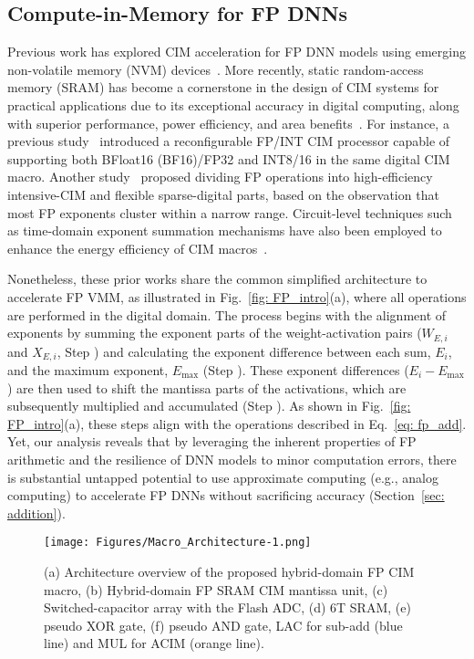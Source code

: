 \subsection{Compute-in-Memory for FP DNNs}







Previous work has explored CIM acceleration for FP DNN models using emerging non-volatile memory (NVM) devices~\cite{luo2020accelerating, PF_CIM_RRAM_0}.
More recently, static random-access memory (SRAM) has become a cornerstone in the design of CIM systems for practical applications due to its exceptional accuracy in digital computing, along with superior performance, power efficiency, and area benefits~\cite{reCIM, Sparse_intense, SRAM_CIM_INT_1, SRAM_CIM_FP_1}.
For instance, a previous study~\cite{reCIM} introduced a reconfigurable FP/INT CIM processor capable of supporting both BFloat16 (BF16)/FP32 and INT8/16 in the same digital CIM macro.
Another study~\cite{Sparse_intense} proposed dividing FP operations into high-efficiency intensive-CIM and flexible sparse-digital parts, based on the observation that most FP exponents cluster within a narrow range. 
Circuit-level techniques such as time-domain exponent summation mechanisms have also been employed to enhance the energy efficiency of CIM macros~\cite{SRAM_CIM_FP_1}.

Nonetheless, these prior works share the common simplified architecture to accelerate FP VMM, as illustrated in Fig.~\ref{fig: FP_intro}(a), where all operations are performed in the digital domain.
The process begins with the alignment of exponents by summing the exponent parts of the weight-activation pairs (${W_{E,i}}$ and ${X_{E,i}}$, Step ) and calculating the exponent difference between each sum, $E_i$,  and the maximum exponent, $E_{\max}$ (Step ).
These exponent differences ($E_i-E_{\max}$) are then used to shift the mantissa parts of the activations, which are subsequently multiplied and accumulated (Step ).
As shown in Fig.~\ref{fig: FP_intro}(a), these steps align with the operations described in Eq.~\eqref{eq: fp_add}.
Yet, our analysis reveals that by leveraging the inherent properties of FP arithmetic and the resilience of DNN models to minor computation errors, there is substantial untapped potential to use approximate computing (e.g., analog computing) to accelerate FP DNNs without sacrificing accuracy (Section~\ref{sec: addition}).




\begin{figure*}
    \centering
    \texttt{[image: Figures/Macro\_Architecture-1.png]} %
     \vskip -6pt
    \caption{(a) Architecture overview of the proposed hybrid-domain FP CIM macro, (b) Hybrid-domain FP SRAM CIM mantissa unit, (c) Switched-capacitor array with the Flash ADC, (d) 6T SRAM, (e) pseudo XOR gate, (f) pseudo AND gate, LAC for sub-add (blue line) and MUL for ACIM (orange line).}
    \label{fig: Architecture}
     \vskip -15pt
\end{figure*}